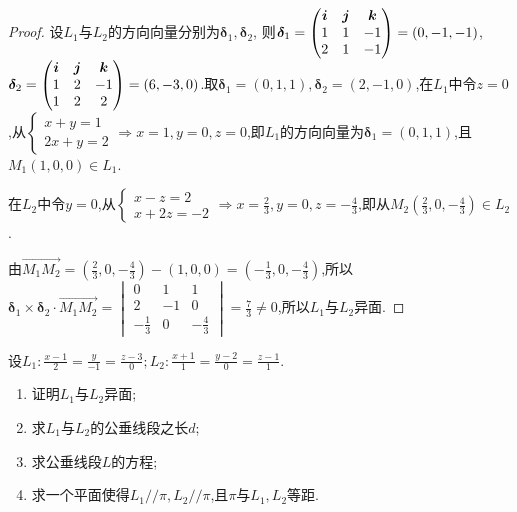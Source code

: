 \begin{proof}
    设$L_1$与$L_2$的方向向量分别为$\bm \delta_1,\bm \delta_2$,
    则$\bm \delta_1 = \begin{pmatrix}
        \bm{i} & \bm{j} & \bm{k} \\
        1 & 1 & -1 \\
        2 & 1 & -1
    \end{pmatrix} = (0,-1,-1)$,$\bm \delta_2 = \begin{pmatrix}
        \bm{i} & \bm{j} & \bm{k} \\
        1 & 2 & -1 \\
        1 & 2 & 2
    \end{pmatrix} = (6,-3,0)$.取$\bm \delta_1 = (0,1,1),\bm \delta_2 = (2,-1,0)$,在$L_1$中令$z=0$,从$\begin{cases}
        x+y=1\\
        2x+y=2
    \end{cases} \Rightarrow x=1,y=0,z=0$,即$L_1$的方向向量为$\bm \delta_1 = (0,1,1)$,且$M_1(1,0,0) \in L_1$.
    
    在$L_2$中令$y=0$,从$\begin{cases}
        x-z=2\\
        x+2z=-2
    \end{cases} \Rightarrow x=\frac23,y=0,z=-\frac43$,即从$M_2(\frac23,0,-\frac43) \in L_2$.

    由$\overrightarrow{M_1 M_2} = (\frac23,0,-\frac43) - (1,0,0) = (-\frac13,0,-\frac43)$,所以$\bm \delta_1 \times \bm \delta_2 \cdot \overrightarrow{M_1M_2} = \begin{vmatrix}
        0 & 1 & 1 \\
        2 & -1 & 0 \\
        -\frac13 & 0 & -\frac43
    \end{vmatrix} = \frac73 \neq 0$,所以$L_1$与$L_2$异面.
\end{proof}

\begin{example}
    设$L_1: \frac{x-1}{2} = \frac{y}{-1} = \frac{z-3}{0}; L_2: \frac{x+1}{1} = \frac{y-2}{0} = \frac{z-1}{1}$.

    \begin{enumerate}
        \item 证明$L_1$与$L_2$异面;
        \item 求$L_1$与$L_2$的公垂线段之长$d$;
        \item 求公垂线段$L$的方程;
        \item 求一个平面使得$L_1 / / \pi, L_2 / / \pi$,且$\pi$与$L_1,L_2$等距.
    \end{enumerate}
\end{example}

